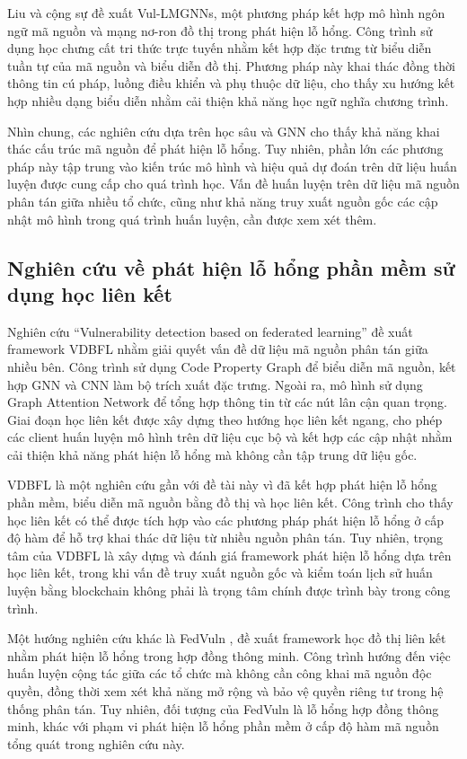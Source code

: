 Liu và cộng sự \cite{liu2025vul-lmgnn} đề xuất Vul-LMGNNs, một phương pháp kết hợp mô hình ngôn ngữ
mã nguồn và mạng nơ-ron đồ thị trong phát hiện lỗ hổng. Công trình sử dụng học chưng cất tri thức
trực tuyến nhằm kết hợp đặc trưng từ biểu diễn tuần tự của mã nguồn và biểu diễn đồ thị. Phương
pháp này khai thác đồng thời thông tin cú pháp, luồng điều khiển và phụ thuộc dữ liệu, cho thấy xu
hướng kết hợp nhiều dạng biểu diễn nhằm cải thiện khả năng học ngữ nghĩa chương trình.

Nhìn chung, các nghiên cứu dựa trên học sâu và GNN cho thấy khả năng khai thác cấu trúc mã nguồn để
phát hiện lỗ hổng. Tuy nhiên, phần lớn các phương pháp này tập trung vào kiến trúc mô hình và hiệu
quả dự đoán trên dữ liệu huấn luyện được cung cấp cho quá trình học. Vấn đề huấn luyện trên dữ liệu
mã nguồn phân tán giữa nhiều tổ chức, cũng như khả năng truy xuất nguồn gốc các cập nhật mô hình
trong quá trình huấn luyện, cần được xem xét thêm.

\subsection{Nghiên cứu về phát hiện lỗ hổng phần mềm sử dụng học liên kết}

Nghiên cứu ``Vulnerability detection based on federated learning'' \cite{zhang2024vul-fl} đề xuất
framework VDBFL nhằm giải quyết vấn đề dữ liệu mã nguồn phân tán giữa nhiều bên. Công trình sử dụng
Code Property Graph để biểu diễn mã nguồn, kết hợp GNN và CNN làm bộ trích xuất đặc trưng. Ngoài
ra, mô hình sử dụng Graph Attention Network để tổng hợp thông tin từ các nút lân cận quan trọng.
Giai đoạn học liên kết được xây dựng theo hướng học liên kết ngang, cho phép các client huấn luyện
mô hình trên dữ liệu cục bộ và kết hợp các cập nhật nhằm cải thiện khả năng phát hiện lỗ hổng mà
không cần tập trung dữ liệu gốc.

VDBFL là một nghiên cứu gần với đề tài này vì đã kết hợp phát hiện lỗ hổng phần mềm, biểu diễn mã
nguồn bằng đồ thị và học liên kết. Công trình cho thấy học liên kết có thể được tích hợp vào các
phương pháp phát hiện lỗ hổng ở cấp độ hàm để hỗ trợ khai thác dữ liệu từ nhiều nguồn phân tán. Tuy
nhiên, trọng tâm của VDBFL là xây dựng và đánh giá framework phát hiện lỗ hổng dựa trên học liên
kết, trong khi vấn đề truy xuất nguồn gốc và kiểm toán lịch sử huấn luyện bằng blockchain không
phải là trọng tâm chính được trình bày trong công trình.

Một hướng nghiên cứu khác là FedVuln \cite{tran2026fedvuln}, đề xuất framework học đồ thị liên kết
nhằm phát hiện lỗ hổng trong hợp đồng thông minh. Công trình hướng đến việc huấn luyện cộng tác
giữa các tổ chức mà không cần công khai mã nguồn độc quyền, đồng thời xem xét khả năng mở rộng và
bảo vệ quyền riêng tư trong hệ thống phân tán. Tuy nhiên, đối tượng của FedVuln là lỗ hổng hợp đồng
thông minh, khác với phạm vi phát hiện lỗ hổng phần mềm ở cấp độ hàm mã nguồn tổng quát trong
nghiên cứu này.

